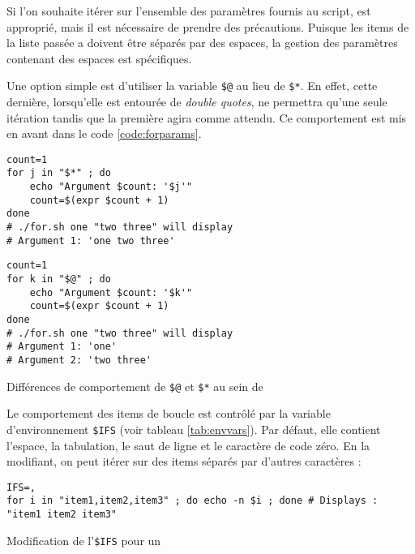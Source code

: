 Si l'on souhaite itérer sur l'ensemble des paramètres fournis au script,  est approprié, mais il est nécessaire de prendre des précautions. Puisque les items de la liste passée a  doivent être séparés par des espaces, la gestion des paramètres contenant des espaces est spécifiques.

Une option simple est d'utiliser la variable \texttt{\$@} au lieu de \texttt{\$*}. En effet, cette dernière, lorsqu'elle est entourée de \textit{double quotes}, ne permettra qu'une seule itération tandis que la première agira comme attendu. Ce comportement est mis en avant dans le code \ref{code:forparams}.

\vspace{\baselineskip}
\begin{code}
    \centering
    \noindent\begin{minipage}{.475\textwidth}
    \begin{verbatim}
count=1
for j in "$*" ; do
    echo "Argument $count: '$j'"
    count=$(expr $count + 1)
done
# ./for.sh one "two three" will display
# Argument 1: 'one two three'
\end{verbatim}
\end{minipage}\hfill
\begin{minipage}{.475\textwidth}
\begin{verbatim}
count=1
for k in "$@" ; do
    echo "Argument $count: '$k'"
    count=$(expr $count + 1)
done
# ./for.sh one "two three" will display 
# Argument 1: 'one'
# Argument 2: 'two three'
\end{verbatim}
\end{minipage}\hfill
\caption{Différences de comportement de \texttt{\$@} et \texttt{\$*} au sein de }
    \label{code:forparams}
\end{code}

Le comportement des items de boucle est contrôlé par la variable d'environnement \texttt{\$IFS} (voir tableau \ref{tab:envvars}). Par défaut, elle contient l'espace, la tabulation, le saut de ligne et le caractère de code zéro. En la modifiant, on peut itérer sur des items séparés par d'autres caractères :
\begin{code}
\begin{verbatim}
IFS=,
for i in "item1,item2,item3" ; do echo -n $i ; done # Displays : "item1 item2 item3"
\end{verbatim}
\vspace{-2mm}
\caption{Modification de l'\texttt{\$IFS} pour un }
    \label{code:forifs}
\end{code}

